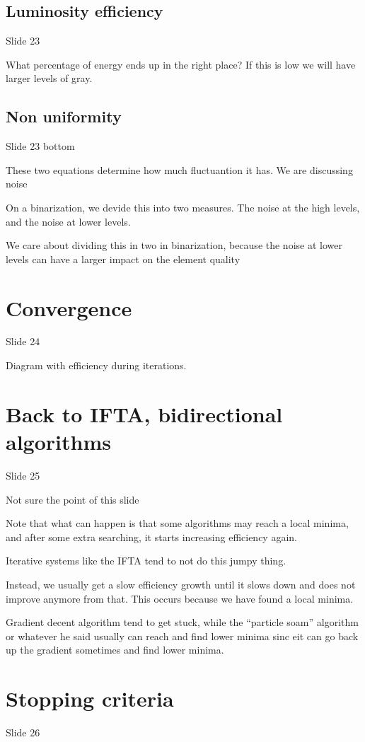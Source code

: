 \documentclass[../main/main.tex]{subfiles}
\begin{document}
\subsection{Luminosity efficiency}
Slide 23

What percentage of energy ends up in the right place? If this is low we will have larger levels of gray.

\subsection{Non uniformity}
Slide 23 bottom

These two equations determine how much fluctuantion it has. We are discussing noise

On a binarization, we devide this into two measures. The noise at the high levels, and the noise at lower levels.

We care about dividing this in two in binarization, because the noise at lower levels can have a larger impact on the element quality


\section{Convergence}
Slide 24

Diagram with efficiency during iterations.


\section{Back to IFTA, bidirectional algorithms}
Slide 25

Not sure the point of this slide

Note that what can happen is that some algorithms may reach a local minima, and after some extra searching, it starts increasing efficiency again.

Iterative systems like the IFTA tend to not do this jumpy thing.

Instead, we usually get a slow efficiency growth until it slows down and does not improve anymore from that. This occurs because we have found a local minima.

Gradient decent algorithm tend to get stuck, while the ``particle soam'' algorithm or whatever he said usually can reach and find lower minima sinc eit can go back up the gradient sometimes and find lower minima.


\section{Stopping criteria}
Slide 26
\end{document}
